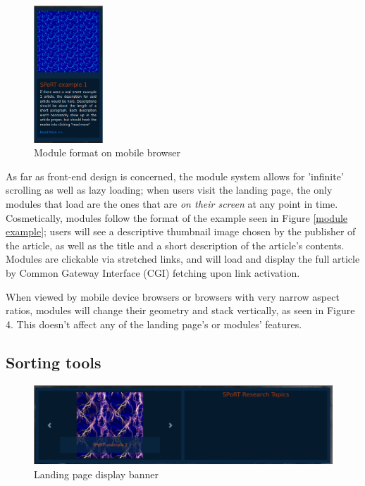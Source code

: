 \documentclass[12pt]{article}
\begin{document}
\begin{figure}
  \begin{center}
    \includegraphics[width=0.23\textwidth]{./figures/phone-module.png}
  \caption{Module format on mobile browser}
  \label{phone module}
  \end{center}
\end{figure}

 As far as front-end design is concerned, the module system allows for 'infinite' scrolling as well as lazy loading; when users visit the landing page, the only modules that load are the ones that are \textit{on their screen} at any point in time. Cosmetically, modules follow the format of the example seen in Figure \ref{module example}; users will see a descriptive thumbnail image chosen by the publisher of the article, as well as the title and a short description of the article's contents. Modules are clickable via stretched links, and will load and display the full article by Common Gateway Interface (CGI) fetching upon link activation.

When viewed by mobile device browsers or browsers with very narrow aspect ratios, modules will change their geometry and stack vertically, as seen in Figure 4. This doesn't affect any of the landing page's or modules' features.

\newpage

\subsection{Sorting tools}
\label{landing page}

\begin{figure}[h]
  \centering
  \includegraphics[width=.66\linewidth]{./figures/display.png}
  \caption{Landing page display banner}
  \label{display} %
\end{figure}
\end{document}
